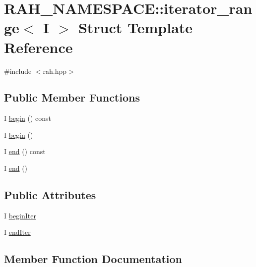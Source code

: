 \hypertarget{struct_r_a_h___n_a_m_e_s_p_a_c_e_1_1iterator__range}{}\section{R\+A\+H\+\_\+\+N\+A\+M\+E\+S\+P\+A\+CE\+::iterator\+\_\+range$<$ I $>$ Struct Template Reference}
\label{struct_r_a_h___n_a_m_e_s_p_a_c_e_1_1iterator__range}


{\ttfamily \#include $<$rah.\+hpp$>$}

\subsection*{Public Member Functions}
\begin{DoxyCompactItemize}
\item 
I \mbox{\hyperlink{struct_r_a_h___n_a_m_e_s_p_a_c_e_1_1iterator__range_a8b83df28fa67ed57a5ea6785f63bee98}{begin}} () const
\item 
I \mbox{\hyperlink{struct_r_a_h___n_a_m_e_s_p_a_c_e_1_1iterator__range_aa34dfea09501b4d1c85c8189b10d4234}{begin}} ()
\item 
I \mbox{\hyperlink{struct_r_a_h___n_a_m_e_s_p_a_c_e_1_1iterator__range_a05e81ee6fc6378ea932c9b39b3fb5314}{end}} () const
\item 
I \mbox{\hyperlink{struct_r_a_h___n_a_m_e_s_p_a_c_e_1_1iterator__range_a718f766d95770b507dc774db533e2f4e}{end}} ()
\end{DoxyCompactItemize}
\subsection*{Public Attributes}
\begin{DoxyCompactItemize}
\item 
I \mbox{\hyperlink{struct_r_a_h___n_a_m_e_s_p_a_c_e_1_1iterator__range_aa902cec0300732ecb7510b44ba8bc379}{begin\+Iter}}
\item 
I \mbox{\hyperlink{struct_r_a_h___n_a_m_e_s_p_a_c_e_1_1iterator__range_acededd2c5311addeab26de9f400dfbf3}{end\+Iter}}
\end{DoxyCompactItemize}


\subsection{Member Function Documentation}
\mbox{\label{struct_r_a_h___n_a_m_e_s_p_a_c_e_1_1iterator__range_a8b83df28fa67ed57a5ea6785f63bee98}} 
